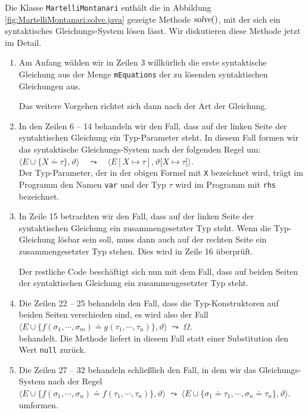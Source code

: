 Die Klasse \texttt{MartelliMontanari} enth\"alt die in Abbildung \ref{fig:MartelliMontanari:solve.java}
gezeigte Methode $\textsl{solve}()$, mit der sich ein syntaktisches Gleichungs-System l\"osen l\"asst.
Wir diskutieren diese Methode jetzt im Detail.
\begin{enumerate}
\item Am Anfang w\"ahlen wir in  Zeilen 3 willk\"urlich die erste syntaktische Gleichung aus der Menge
      \texttt{mEquations} der zu l\"osenden syntaktischen Gleichungen aus.  
      
      Das weitere Vorgehen richtet sich dann nach der Art der Gleichung.
\item In den Zeilen 6 -- 14 behandeln wir den Fall, dass auf der linken Seite der syntaktischen Gleichung
      ein Typ-Parameter steht.  In diesem Fall formen wir das syntaktische Gleichungs-System nach
      der folgenden Regel um:
      \\[0.2cm]
      \hspace*{1.3cm}
      $\Big\langle E \cup \big\{ X \doteq \tau \big\}, \vartheta \Big\rangle \quad\leadsto\quad 
       \Big\langle E[X \mapsto \tau], \vartheta\big[ X \mapsto \tau \big] \Big\rangle$. 
      \\[0.2cm]
      Der Typ-Parameter, der in der obigen Formel mit \texttt{X} bezeichnet wird, tr\"agt im Programm 
      den Namen \texttt{var} und der Typ $\tau$ wird im Programm mit \texttt{rhs} bezeichnet.
\item In Zeile 15 betrachten wir den Fall, dass auf der linken Seite der syntaktischen Gleichung
      ein zusammengesetzter Typ steht.  Wenn die Typ-Gleichung l\"osbar sein soll, muss dann auch auf der
      rechten Seite ein zusammengesetzter Typ stehen.  Dies wird in  Zeile 16 \"uberpr\"uft.

      Der restliche Code besch\"aftigt sich nun mit dem Fall, dass auf beiden Seiten der syntaktischen
      Gleichung ein zusammengesetzter Typ steht.
\item Die Zeilen 22 -- 25 behandeln den Fall, dass die Typ-Konstruktoren auf beiden Seiten verschieden sind,
      es wird also der Fall
      \\[0.2cm]
      \hspace*{1.3cm}
      $\Big\langle E \cup \big\{ f(\sigma_1,\cdots,\sigma_m) \doteq g(\tau_1,\cdots,\tau_n) \big\}, 
       \vartheta \Big\rangle 
       \;\leadsto\; \Omega$. 
      \\[0.2cm]
      behandelt.  Die Methode liefert in diesem Fall statt einer Substitution den Wert \texttt{null}
      zur\"uck.
\item Die Zeilen 27 -- 32 behandeln schlie{\ss}lich den Fall, in dem wir das Gleichungs-System nach der Regel
      \\[0.2cm]
      \hspace*{1.3cm}
      $\Big\langle E \cup \big\{ f(\sigma_1,\cdots,\sigma_n) \doteq f(\tau_1,\cdots,\tau_n) \big\}, 
       \vartheta \Big\rangle 
       \;\leadsto\; 
       \Big\langle E \cup \big\{ \sigma_1 \doteq \tau_1, \cdots, \sigma_n \doteq \tau_n\}, 
       \vartheta \Big\rangle$.
      \\[0.2cm]
      umformen.
\end{enumerate}

